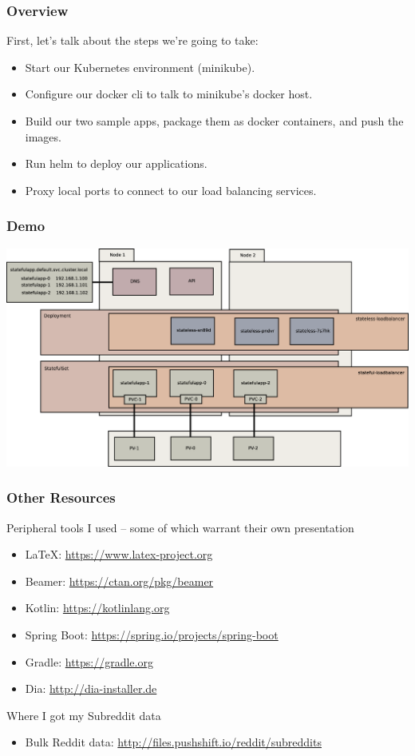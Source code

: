 \documentclass{beamer}
\begin{document}
\begin{frame}
    \frametitle{Overview}
    First, let's talk about the steps we're going to take:
    \begin{itemize}
        \item Start our Kubernetes environment (minikube).
        \item Configure our docker cli to talk to minikube's docker host.
        \item Build our two sample apps, package them as docker containers, and push the images.
        \item Run helm to deploy our applications.
        \item Proxy local ports to connect to our load balancing services.
    \end{itemize}
\end{frame}

\begin{frame}
    \frametitle{Demo}
    \includegraphics[width=\textwidth,height=0.85\textheight,keepaspectratio]{graphics/08-loadBalancer.eps}
\end{frame}

\begin{frame}
\frametitle{Other Resources}
Peripheral tools I used -- some of which warrant their own presentation
\begin{itemize}
    \item \LaTeX: \href{https://www.latex-project.org}{https://www.latex-project.org}
    \item Beamer: \href{https://ctan.org/pkg/beamer}{https://ctan.org/pkg/beamer}
    \item Kotlin: \href{https://kotlinlang.org}{https://kotlinlang.org}
    \item Spring Boot: \href{https://spring.io/projects/spring-boot}{https://spring.io/projects/spring-boot}
    \item Gradle: \href{https://gradle.org}{https://gradle.org}
    \item Dia: \href{http://dia-installer.de}{http://dia-installer.de}
\end{itemize}
\smallskip
Where I got my Subreddit data
\begin{itemize}
    \item Bulk Reddit data: \href{http://files.pushshift.io/reddit/subreddits}{http://files.pushshift.io/reddit/subreddits}
\end{itemize}
\end{frame}
\end{document}
